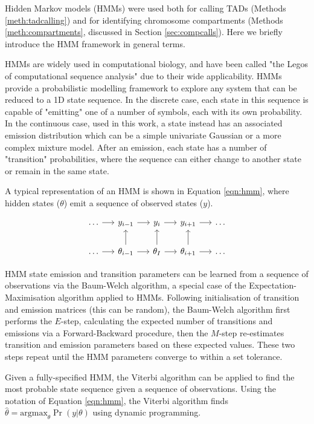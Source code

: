 \documentclass[a4paper,11pt,oneside]{book}
\begin{document}
Hidden Markov models (HMMs) were used both for calling TADs (Methods \ref{meth:tadcalling}) and for identifying chromosome compartments (Methods \ref{meth:compartments}, discussed in Section \ref{sec:compcalls}). Here we briefly introduce the HMM framework in general terms.

HMMs are widely used in computational biology, and have been called "the Legos of computational sequence analysis"\cite{Eddy2004} due to their wide applicability. HMMs provide a probabilistic modelling framework to explore any system that can be reduced to a 1D state sequence.\cite{Eddy1996, Rabiner1989} In the discrete case, each state in this sequence is capable of "emitting" one of a number of symbols, each with its own probability. In the continuous case, used in this work, a state instead has an associated emission distribution which can be a simple univariate Gaussian or a more complex mixture model. After an emission, each state has a number of "transition" probabilities, where the sequence can either change to another state or remain in the same state.

A typical representation of an HMM is shown in Equation \ref{eqn:hmm}, where hidden states ($\theta$) emit a sequence of observed states ($y$).\cite{Volg2005}

\begin{equation}\label{eqn:hmm}
\begin{tikzcd}[column sep=1.2pc]
\ldots \arrow{r} & y_{i-1} \arrow{r} & y_i \arrow{r} & y_{i+1} \arrow{r} & \ldots\\
\ldots \arrow{r} & \theta_{i-1} \arrow{r} \arrow{u} &
\theta_I \arrow{u} \arrow{r} & \theta_{i+1} \arrow{u} \arrow{r} & \ldots
\end{tikzcd}
\end{equation}

HMM state emission and transition parameters can be learned from a sequence of observations via the Baum-Welch algorithm,\cite{Baum1970} a special case of the Expectation-Maximisation algorithm applied to HMMs. Following initialisation of transition and emission matrices (this can be random), the Baum-Welch algorithm first performs the $E$-step, calculating the expected number of transitions and emissions via a Forward-Backward procedure, then the $M$-step re-estimates transition and emission parameters based on these expected values. These two steps repeat until the HMM parameters converge to within a set tolerance.

Given a fully-specified HMM, the Viterbi algorithm can be applied to find the most probable state sequence given a sequence of observations.\cite{ryan1993viterbi} Using the notation of Equation \ref{eqn:hmm}, the Viterbi algorithm finds $\hat{\theta} = \mathrm{argmax}_\theta \Pr( y \vert \theta)$ using dynamic programming.\cite{Volg2005}
\end{document}
